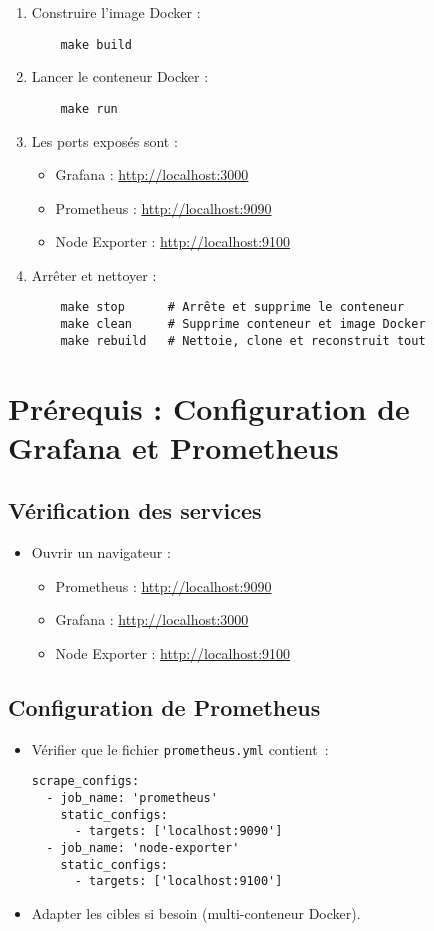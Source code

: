 \documentclass[a4paper,12pt]{article}
\begin{document}
\begin{enumerate}[label=\alph*)]
    \item Construire l’image Docker :
    \begin{verbatim}
    make build
    \end{verbatim}
    \item Lancer le conteneur Docker :
    \begin{verbatim}
    make run
    \end{verbatim}
    \item Les ports exposés sont :
    \begin{itemize}
        \item Grafana : \url{http://localhost:3000}
        \item Prometheus : \url{http://localhost:9090}
        \item Node Exporter : \url{http://localhost:9100}
    \end{itemize}
    \item Arrêter et nettoyer :
    \begin{verbatim}
    make stop      # Arrête et supprime le conteneur
    make clean     # Supprime conteneur et image Docker
    make rebuild   # Nettoie, clone et reconstruit tout
    \end{verbatim}
\end{enumerate}

\section{Prérequis : Configuration de Grafana et Prometheus}

\subsection{Vérification des services}
\begin{itemize}
    \item Ouvrir un navigateur :
    \begin{itemize}
        \item Prometheus : \url{http://localhost:9090}
        \item Grafana : \url{http://localhost:3000}
        \item Node Exporter : \url{http://localhost:9100}
    \end{itemize}
\end{itemize}

\subsection{Configuration de Prometheus}
\begin{itemize}
    \item Vérifier que le fichier \texttt{prometheus.yml} contient :
\begin{verbatim}
scrape_configs:
  - job_name: 'prometheus'
    static_configs:
      - targets: ['localhost:9090']
  - job_name: 'node-exporter'
    static_configs:
      - targets: ['localhost:9100']
\end{verbatim}
    \item Adapter les cibles si besoin (multi-conteneur Docker).
\end{itemize}
\end{document}
